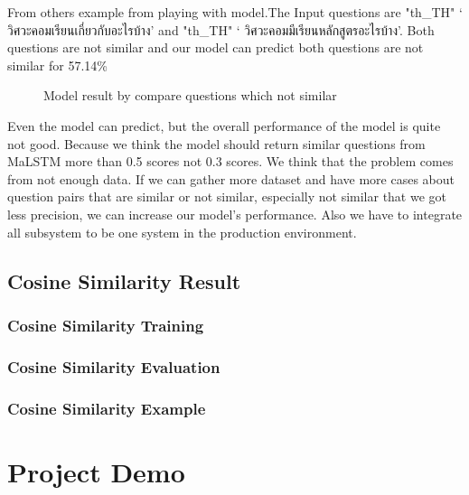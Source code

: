 \documentclass[12pt,oneside,openright,a4paper]{cpe-english-project}
\begin{document}
From others example from playing with model.The Input questions are
{
\XeTeXlinebreaklocale "th_TH"	
\thaifont 
 ‘ วิศวะคอมเรียนเกี่ยวกับอะไรบ้าง’ }and 
{
\XeTeXlinebreaklocale "th_TH"	
\thaifont ‘ วิศวะคอมมีเรียนหลักสูตรอะไรบ้าง’.}
 Both questions are not similar and our model can predict both questions are not similar for 57.14\%

\begin{figure}[!h]\centering
{}
\caption{Model result by compare questions which not similar}\label{fig:Model result by compare questions which not similar}
\end{figure}

Even the model can predict, but the overall performance of the model is quite not good. Because we think the model should return similar questions from MaLSTM more than 0.5 scores not 0.3 scores. We think that the problem comes from not enough data. If we can gather more dataset and have more cases about question pairs that are similar or not similar, especially not similar that we got less precision, we can increase our model's performance. Also we have to integrate all subsystem to be one system in the production environment.

\subsection{Cosine Similarity Result}
\subsubsection{Cosine Similarity Training}
\subsubsection{Cosine Similarity Evaluation}
\subsubsection{Cosine Similarity Example}

\section{Project Demo}
\end{document}
